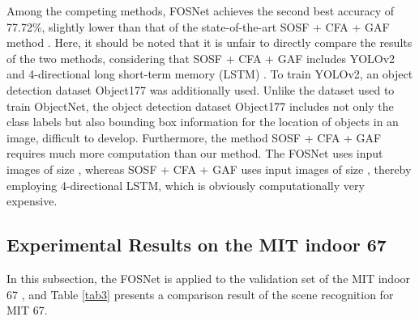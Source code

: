 \documentclass[journal,comsoc]{IEEEtran}
\begin{document}
Among the competing methods, FOSNet achieves the second best accuracy of 77.72\%, slightly lower than that of the state-of-the-art SOSF + CFA + GAF method \cite{b4}. Here, it should be noted that it is unfair to directly compare the results of the two methods, considering that SOSF + CFA + GAF \cite{b4} includes YOLOv2 \cite{b41} and 4-directional long short-term memory (LSTM) \cite{b44}. To train YOLOv2, an object detection dataset Object177 \cite{b47} was additionally used. Unlike the dataset used to train ObjectNet, the object detection dataset Object177 includes not only the class labels but also bounding box information for the location of objects in an image, difficult to develop. Furthermore, the method SOSF + CFA + GAF requires much more computation than our method. The FOSNet uses input images of size , whereas SOSF + CFA + GAF uses input images of size , thereby employing 4-directional LSTM, which is obviously computationally very expensive.



\subsection{Experimental Results on the MIT indoor 67}
\label{s45}
In this subsection, the FOSNet is applied to the validation set of the MIT indoor 67 \cite{b34}, and Table \ref{tab3} presents a comparison result of the scene recognition for MIT 67.
\end{document}
